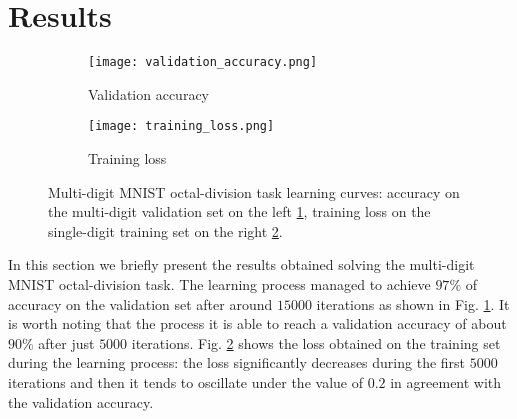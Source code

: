 \section{Results}
\label{sec:results}

\begin{figure}[t]
    \centering
    \begin{subfigure}[b]{0.45\textwidth}
        \centerline{\texttt{[image: validation\_accuracy.png]}}
        \caption{Validation accuracy}
        \label{fig:acc}
    \end{subfigure}
    \hfill
    \begin{subfigure}[b]{0.45\textwidth}
        \centerline{\texttt{[image: training\_loss.png]}}
        \caption{Training loss}
        \label{fig:loss}
    \end{subfigure}
    \caption{Multi-digit MNIST octal-division task learning curves: accuracy on the multi-digit validation set on the left \ref{fig:acc}, training loss on the single-digit training set on the right \ref{fig:loss}.}
    \label{fig:training_curves}
\end{figure}

In this section we briefly present the results obtained solving the multi-digit MNIST octal-division task.
The learning process managed to achieve $97\%$ of accuracy on the validation set after around $15000$ iterations as shown in Fig. \ref{fig:acc}. It is worth noting that the process it is able to reach a validation accuracy of about $90\%$ after just $5000$ iterations.
Fig. \ref{fig:loss} shows the loss obtained on the training set during the learning process: the loss significantly decreases during the first $5000$ iterations and then it tends to oscillate under the value of $0.2$ in agreement with the validation accuracy.






